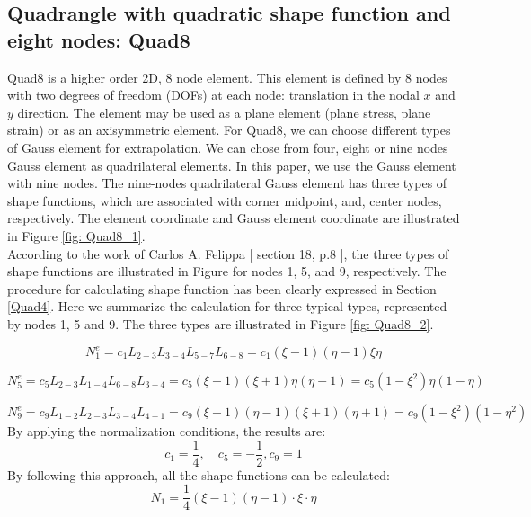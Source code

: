 \subsection{Quadrangle with quadratic shape function and eight nodes: Quad8}
Quad8 is a higher order 2D, 8 node element. This element is defined by 8 nodes with two degrees of freedom (DOFs) at each node: translation in the nodal $x$ and $y$ direction. The element may be used as a plane element (plane stress, plane strain) or as an axisymmetric element. For Quad8, we can choose different types of Gauss element for extrapolation. We can chose from four, eight or nine nodes Gauss element as quadrilateral elements. In this paper, we use the Gauss element with nine nodes. The nine-nodes quadrilateral Gauss element has three types of shape functions, which are associated with corner midpoint, and, center nodes, respectively. The element coordinate and Gauss element coordinate are illustrated in Figure \ref{fig: Quad8_1}. \\
According to the work of Carlos A. Felippa [\cite{Felippa} section 18, p.8 ], the three types of shape functions are illustrated in Figure for nodes 1, 5, and 9, respectively. The procedure for calculating shape function has been clearly expressed in Section \ref{Quad4}. Here we summarize the calculation for three typical types, represented by nodes 1, 5 and 9. The three types are illustrated in Figure \ref{fig: Quad8_2}.

\begin{equation} \label{eq: Quad8_1}
N_1^e = c_1 L_{2-3}L_{3-4}L_{5-7} L_{6-8} = c_1 \left(\xi - 1\right) \left(\eta -1\right) \xi \eta
\end{equation}

\begin{equation} \label{eq: Quad8_2}
N_5^e = c_5L_{2-3} L_{1-4} L_{6-8} L_{3-4} = c_5 \left(\xi -1 \right) \left( \xi +1\right) \eta \left( \eta -1\right) = c_5 \left(1-\xi^2\right) \eta \left(1 - \eta\right)
\end{equation}

\begin{equation} \label{eq: Quad8_3}
N_9^e = c_9L_{1-2} L_{2-3} L_{3-4} L_{4-1} = c_9 \left(\xi -1 \right) \left( \eta - 1\right) \left(\xi + 1\right) \left( \eta + 1\right) = c_9 \left(1-\xi^2\right) \left(1 - \eta^2\right)
\end{equation}
By applying the normalization conditions, the results are:
\begin{equation*}
c_1 = \frac{1}{4}, \quad c_5 = -\frac{1}{2}, c_9 = 1
\end{equation*}
By following this approach, all the shape functions can be calculated:
\begin{equation}
N_1 = \frac{1}{4} \left(\xi - 1\right) \left( \eta -1 \right) \cdot\xi \cdot\eta
\end{equation}

